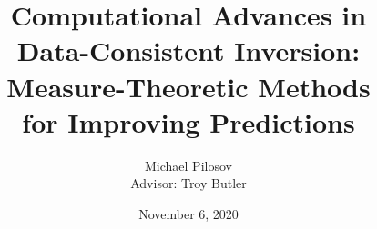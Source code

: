 \documentclass[10pt]{beamer}
\author{Michael Pilosov\\ \vskip 5pt{Advisor: Troy Butler}}%
\title[CG]{Computational Advances in\\Data-Consistent Inversion:\\Measure-Theoretic Methods\\for Improving Predictions}
\institute{University of Colorado Denver}
\date{November 6, 2020}
\begin{document}
\begin{frame}[t,plain]
    \titlepage
\end{frame}








% 
% 









\end{document}
